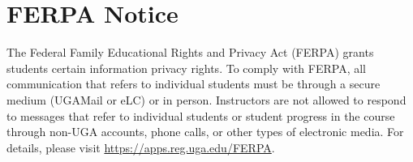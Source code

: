 \documentclass[12pt]{article}
\begin{document}
\vspace{-2mm}
\section*{\normalsize FERPA Notice}
\vspace{-4mm}

The Federal Family Educational Rights and Privacy Act (FERPA) grants
students certain information privacy rights. To comply with FERPA, all
communication that refers to individual students must be through a
secure medium (UGAMail or eLC) or in person. Instructors are not
allowed to respond to messages that refer to individual students or
student progress in the course through non-UGA accounts, phone calls,
or other types of electronic media. For details, please visit
\url{https://apps.reg.uga.edu/FERPA}. 
\end{document}
